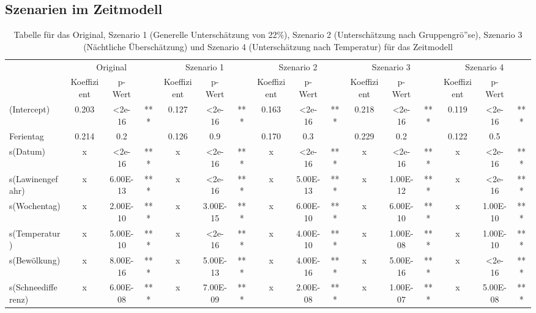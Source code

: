 \documentclass[12pt]{scrreprt}
\begin{document}
\subsection{Szenarien im Zeitmodell}
\begin{table}[htbp]
	\centering
	\caption{Tabelle für das Original, Szenario 1 (Generelle Unterschätzung von 22\%), Szenario 2 (Unterschätzung nach Gruppengrö”se), Szenario 3 (Nächtliche Überschätzung) und Szenario 4 (Unterschätzung nach Temperatur) für das Zeitmodell}
	\begin{adjustbox}{max width=\textwidth}
	\begin{tabular}{l|ccc|ccc|ccc|ccc|ccc|}
		\multicolumn{1}{r}{} & \multicolumn{3}{c}{Original} & \multicolumn{3}{c}{Szenario 1} &
		\multicolumn{3}{c}{Szenario 2} & 
		\multicolumn{3}{c}{Szenario 3} & 
		\multicolumn{3}{c}{Szenario 4} \\
		& Koeffizient & p-Wert &       & Koeffizient & p-Wert &       & Koeffizient & p-Wert &       & Koeffizient & p-Wert &       & Koeffizient & p-Wert &  \\
		\cmidrule{2-16}    (Intercept) & 0.203 & <2e-16 & ***   & 0.127 & <2e-16 & ***   & 0.163 & <2e-16 & ***   & 0.218 & <2e-16 & ***   & 0.119 & <2e-16 & *** \\
		Ferientag & 0.214 & 0.2   &       & 0.126 & 0.9   &       & 0.170 & 0.3   &       & 0.229 & 0.2   &       & 0.122 & 0.5   &   \\
		s(Datum) & x     & <2e-16 & ***   & x     & <2e-16 & ***   & x     & <2e-16 & ***   & x     & <2e-16 & ***   & x     & <2e-16 & *** \\
		s(Lawinengefahr) & x     & 6.00E-13 & ***   & x     & <2e-16 & ***   & x     & 5.00E-13 & ***   & x     & 1.00E-12 & ***   & x     & <2e-16 & *** \\
		s(Wochentag) & x     & 2.00E-10 & ***   & x     & 3.00E-15 & ***   & x     & 6.00E-10 & ***   & x     & 6.00E-10 & ***   & x     & 1.00E-10 & *** \\
		s(Temperatur) & x     & 5.00E-10 & ***   & x     & <2e-16 & ***   & x     & 4.00E-10 & ***   & x     & 1.00E-08 & ***   & x     & 1.00E-10 & *** \\
		s(Bewölkung) & x     & 8.00E-16 & ***   & x     & 5.00E-13 & ***   & x     & 4.00E-16 & ***   & x     & 5.00E-16 & ***   & x     & <2e-16 & *** \\
		s(Schneedifferenz) & x     & 6.00E-08 & ***   & x     & 7.00E-09 & ***   & x     & 2.00E-08 & ***   & x     & 1.00E-07 & ***   & x     & 5.00E-08 & *** \\
		\cmidrule{2-16}    \end{tabular}%
	\end{adjustbox}
	\label{tab:Szenarien im Zeitmodell}%
\end{table}%
\end{document}
